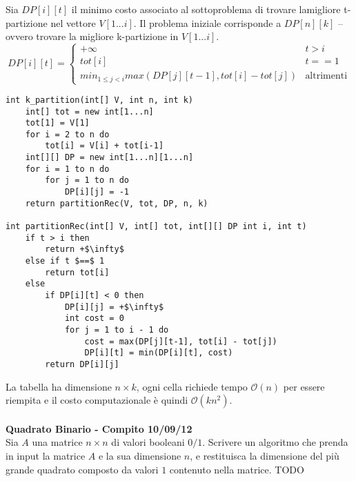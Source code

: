 \documentclass[../cheatSheetAlgoritmi.tex]{subfiles}
\begin{document}
Sia $DP[i][t]$ il minimo costo associato al sottoproblema di trovare lamigliore t-partizione nel vettore $V[1...i]$. Il problema iniziale corrisponde a $DP[n][k]$ – ovvero trovare la migliore k-partizione in $V[1...i]$.
\begin{equation*}
    DP[i][t]=\begin{cases}
        +\infty & \text{$t > i$}\\
        tot[i] & \text{$t == 1$} \\
        min_{1 \leq j < i}max(DP[j][t-1], tot[i] - tot[j]) & \text{altrimenti}
    \end{cases}
\end{equation*}
\begin{lstlisting}[caption=k-partizioni]
int k_partition(int[] V, int n, int k)
	int[] tot = new int[1...n]
	tot[1] = V[1]
	for i = 2 to n do
		tot[i] = V[i] + tot[i-1]
	int[][] DP = new int[1...n][1...n]
	for i = 1 to n do
		for j = 1 to n do
			DP[i][j] = -1
	return partitionRec(V, tot, DP, n, k)
	
int partitionRec(int[] V, int[] tot, int[][] DP int i, int t)
	if t > i then
		return +$\infty$
	else if t $==$ 1
		return tot[i]
	else
		if DP[i][t] < 0 then
			DP[i][j] = +$\infty$
			int cost = 0
			for j = 1 to i - 1 do
				cost = max(DP[j][t-1], tot[i] - tot[j])
				DP[i][t] = min(DP[i][t], cost)
		return DP[i][j]
\end{lstlisting}
La tabella ha dimensione $n \times k$, ogni cella richiede tempo $\mathcal{O}(n)$ per essere riempita e il costo computazionale è quindi $\mathcal{O}(kn^{2})$.\\\\
\textbf{Quadrato Binario - Compito 10/09/12}\\
Sia $A$ una matrice $n \times n$ di valori booleani $0/1$. Scrivere un algoritmo che prenda in input la matrice $A$ e la sua dimensione $n$, e restituisca la dimensione del più grande quadrato composto da valori $1$ contenuto nella matrice.
TODO
\newpage
\end{document}
